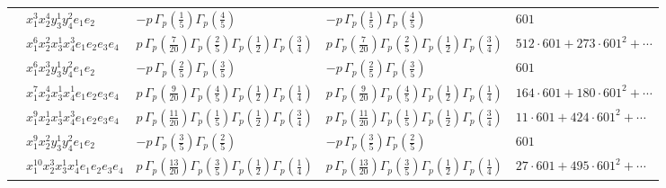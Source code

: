 \documentclass[11pt]{article}
\begin{document}
\begin{table}[ht]
{\begin{tabular}{@{}lllll@{}}
 & $x_{1}^{3} x_{2}^{4} y_{3}^{1} y_{4}^{2} e_{1} e_{2}$ & $- p \, \Gamma_p \left( \frac{1}{5} \right) \Gamma_p \left( \frac{4}{5} \right)$ & $- p \, \Gamma_p \left( \frac{1}{5} \right) \Gamma_p \left( \frac{4}{5} \right)$ & $601$ \\
 & $x_{1}^{6} x_{2}^{2} x_{3}^{1} x_{4}^{3}  e_{1} e_{2} e_{3} e_{4}$ & $p \, \Gamma_p \left( \frac{7}{20} \right) \Gamma_p \left( \frac{2}{5} \right) \Gamma_p \left( \frac{1}{2} \right) \Gamma_p \left( \frac{3}{4} \right)$ & $p \, \Gamma_p \left( \frac{7}{20} \right) \Gamma_p \left( \frac{2}{5} \right) \Gamma_p \left( \frac{1}{2} \right) \Gamma_p \left( \frac{3}{4} \right)$ & $512{\cdot}601{+}273{\cdot}601^{2}{+}\cdots$ \\
 & $x_{1}^{6} x_{2}^{3} y_{3}^{1} y_{4}^{2} e_{1} e_{2}$ & $- p \, \Gamma_p \left( \frac{2}{5} \right) \Gamma_p \left( \frac{3}{5} \right)$ & $- p \, \Gamma_p \left( \frac{2}{5} \right) \Gamma_p \left( \frac{3}{5} \right)$ & $601$ \\
 & $x_{1}^{7} x_{2}^{4} x_{3}^{1} x_{4}^{1}  e_{1} e_{2} e_{3} e_{4}$ & $p \, \Gamma_p \left( \frac{9}{20} \right) \Gamma_p \left( \frac{4}{5} \right) \Gamma_p \left( \frac{1}{2} \right) \Gamma_p \left( \frac{1}{4} \right)$ & $p \, \Gamma_p \left( \frac{9}{20} \right) \Gamma_p \left( \frac{4}{5} \right) \Gamma_p \left( \frac{1}{2} \right) \Gamma_p \left( \frac{1}{4} \right)$ & $164{\cdot}601{+}180{\cdot}601^{2}{+}\cdots$ \\
 & $x_{1}^{9} x_{2}^{1} x_{3}^{1} x_{4}^{3}  e_{1} e_{2} e_{3} e_{4}$ & $p \, \Gamma_p \left( \frac{11}{20} \right) \Gamma_p \left( \frac{1}{5} \right) \Gamma_p \left( \frac{1}{2} \right) \Gamma_p \left( \frac{3}{4} \right)$ & $p \, \Gamma_p \left( \frac{11}{20} \right) \Gamma_p \left( \frac{1}{5} \right) \Gamma_p \left( \frac{1}{2} \right) \Gamma_p \left( \frac{3}{4} \right)$ & $11{\cdot}601{+}424{\cdot}601^{2}{+}\cdots$ \\
 & $x_{1}^{9} x_{2}^{2} y_{3}^{1} y_{4}^{2} e_{1} e_{2}$ & $- p \, \Gamma_p \left( \frac{3}{5} \right) \Gamma_p \left( \frac{2}{5} \right)$ & $- p \, \Gamma_p \left( \frac{3}{5} \right) \Gamma_p \left( \frac{2}{5} \right)$ & $601$ \\
 & $x_{1}^{10} x_{2}^{3} x_{3}^{1} x_{4}^{1}  e_{1} e_{2} e_{3} e_{4}$ & $p \, \Gamma_p \left( \frac{13}{20} \right) \Gamma_p \left( \frac{3}{5} \right) \Gamma_p \left( \frac{1}{2} \right) \Gamma_p \left( \frac{1}{4} \right)$ & $p \, \Gamma_p \left( \frac{13}{20} \right) \Gamma_p \left( \frac{3}{5} \right) \Gamma_p \left( \frac{1}{2} \right) \Gamma_p \left( \frac{1}{4} \right)$ & $27{\cdot}601{+}495{\cdot}601^{2}{+}\cdots$ \\

\end{tabular}}
\end{table}
\end{document}
